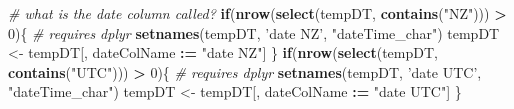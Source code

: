\documentclass[]{article}
\newenvironment{Shaded}{\begin{snugshade}}{\end{snugshade}}
\newcommand{\KeywordTok}[1]{\textcolor[rgb]{0.13,0.29,0.53}{\textbf{#1}}}
\newcommand{\DecValTok}[1]{\textcolor[rgb]{0.00,0.00,0.81}{#1}}
\newcommand{\StringTok}[1]{\textcolor[rgb]{0.31,0.60,0.02}{#1}}
\newcommand{\CommentTok}[1]{\textcolor[rgb]{0.56,0.35,0.01}{\textit{#1}}}
\newcommand{\ControlFlowTok}[1]{\textcolor[rgb]{0.13,0.29,0.53}{\textbf{#1}}}
\newcommand{\OperatorTok}[1]{\textcolor[rgb]{0.81,0.36,0.00}{\textbf{#1}}}
\newcommand{\ErrorTok}[1]{\textcolor[rgb]{0.64,0.00,0.00}{\textbf{#1}}}
\newcommand{\NormalTok}[1]{#1}
\begin{document}
\begin{Shaded}
\begin{Highlighting}[]
    \CommentTok{# what is the date column called?}
      \ControlFlowTok{if}\NormalTok{(}\KeywordTok{nrow}\NormalTok{(}\KeywordTok{select}\NormalTok{(tempDT, }\KeywordTok{contains}\NormalTok{(}\StringTok{"NZ"}\NormalTok{))) }\OperatorTok{>}\StringTok{ }\DecValTok{0}\NormalTok{)\{ }\CommentTok{# requires dplyr}
        \KeywordTok{setnames}\NormalTok{(tempDT, }\StringTok{'date NZ'}\NormalTok{, }\StringTok{"dateTime_char"}\NormalTok{)}
\NormalTok{        tempDT <-}\StringTok{ }\NormalTok{tempDT[, dateColName }\OperatorTok{:}\ErrorTok{=}\StringTok{ "date NZ"}\NormalTok{]}
\NormalTok{      \} }
      \ControlFlowTok{if}\NormalTok{(}\KeywordTok{nrow}\NormalTok{(}\KeywordTok{select}\NormalTok{(tempDT, }\KeywordTok{contains}\NormalTok{(}\StringTok{"UTC"}\NormalTok{))) }\OperatorTok{>}\StringTok{ }\DecValTok{0}\NormalTok{)\{ }\CommentTok{# requires dplyr}
        \KeywordTok{setnames}\NormalTok{(tempDT, }\StringTok{'date UTC'}\NormalTok{, }\StringTok{"dateTime_char"}\NormalTok{)}
\NormalTok{        tempDT <-}\StringTok{ }\NormalTok{tempDT[, dateColName }\OperatorTok{:}\ErrorTok{=}\StringTok{ "date UTC"}\NormalTok{]}
\NormalTok{      \}}
      

\end{Highlighting}
\end{Shaded}
\end{document}
